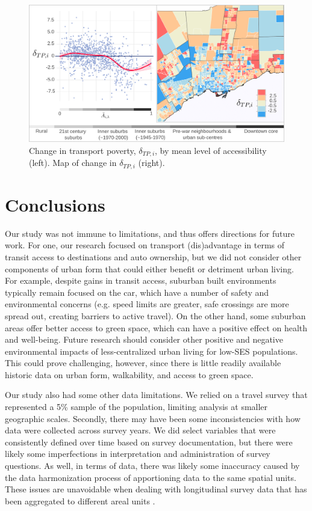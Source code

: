 \begin{figure}[H]
	
	\centering
	
	
	\hspace*{-0.333in}
	\includegraphics[width=6.5in]{figures/Fig5_tp_time.png}
	
	
	\caption{{Change in transport poverty, $\delta_{TP,i}$, by mean level of accessibility (left). Map of change in $\delta_{TP,i}$ (right).}}
	\label{fig:tpov}
\end{figure}



\section{Conclusions}

Our study was not immune to limitations, and thus offers directions for future work. For one, our research focused on transport (dis)advantage in terms of transit access to destinations and auto ownership, but we did not consider other components of urban form that could either benefit or detriment urban living. For example, despite gains in transit access, suburban built environments typically remain focused on the car, which have a number of safety and environmental concerns (e.g. speed limits are greater, safe crossings are more spread out, creating barriers to active travel). On the other hand, some suburban areas offer better access to green space, which can have a positive effect on health and well-being. Future research should consider other positive and negative environmental impacts of less-centralized urban living for low-SES populations. This could prove challenging, however, since there is little readily available historic data on urban form, walkability, and access to green space.

Our study also had some other data limitations. We relied on a travel survey that represented a 5\% sample of the population, limiting analysis at smaller geographic scales. Secondly, there may have been some inconsistencies with how data were collected across survey years. We did select variables that were consistently defined over time based on survey documentation, but there were likely some imperfections in interpretation and administration of survey questions. As well, in terms of data, there was likely some inaccuracy caused by the data harmonization process of apportioning data to the same spatial units. These issues are unavoidable when dealing with longitudinal survey data that has been aggregated to different areal units \cite{allen_new_2018}. 


